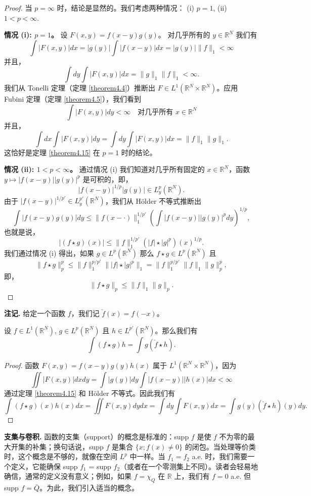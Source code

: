 \begin{proof}
当 $p=\infty$ 时，结论是显然的。我们考虑两种情况：
(i) $p=1$,
(ii) $1 < p < \infty$.

\textbf{情况 (i): $p=1$。} 设 $F(x, y) = f(x-y)g(y)$。
对几乎所有的 $y \in \mathbb{R}^N$ 我们有
\[ \int |F(x,y)|dx = |g(y)| \int |f(x-y)|dx = |g(y)| \|f\|_1 < \infty \]
并且，
\[ \int dy \int |F(x,y)|dx = \|g\|_1 \|f\|_1 < \infty. \]
我们从 Tonelli 定理（定理 \ref{theorem4.4}）推断出 $F \in L^1(\mathbb{R}^N \times \mathbb{R}^N)$。应用 Fubini 定理（定理 \ref{theorem4.5}），我们看到
\[ \int |F(x,y)|dy < \infty \quad \text{对几乎所有 } x \in \mathbb{R}^N \]
并且，
\[ \int dx \int |F(x,y)|dy = \int dy \int |F(x,y)|dx = \|f\|_1 \|g\|_1. \]
这恰好是定理 \ref{theorem4.15} 在 $p=1$ 时的结论。

\textbf{情况 (ii): $1 < p < \infty$。} 通过情况 (i) 我们知道对几乎所有固定的 $x \in \mathbb{R}^N$，函数 $y \mapsto |f(x-y)| |g(y)|^p$ 是可积的，即，
\[ |f(x-y)|^{1/p} |g(y)| \in L^p_y(\mathbb{R}^N). \]
由于 $|f(x-y)|^{1/p'} \in L^{p'}_y(\mathbb{R}^N)$，我们从 Hölder 不等式推断出
\[ \int |f(x-y)g(y)|dy \le \|f(x-\cdot)\|_1^{1/p'} \left( \int |f(x-y)||g(y)|^p dy \right)^{1/p}, \]
也就是说，
\[ |(f \star g)(x)| \le \|f\|_1^{1/p'} (|f| \star |g|^p)(x)^{1/p}. \]
我们通过情况 (i) 得出，如果 $g \in L^p(\mathbb{R}^N)$ 那么 $f \star g \in L^p(\mathbb{R}^N)$ 且
\[ \|f \star g\|_p^p \le \|f\|_1^{p/p'} \| |f| \star |g|^p \|_1 = \|f\|_1^{p/p'} \|f\|_1 \|g\|_p^p, \]
即，
\[ \|f \star g\|_p \le \|f\|_1 \|g\|_p. \]
\end{proof}
\textbf{注记.} 给定一个函数 $f$，我们记 $\check{f}(x) = f(-x)$。

\begin{proposition}\label{proposition4.16}
设 $f \in L^1(\mathbb{R}^N)$, $g \in L^p(\mathbb{R}^N)$ 且 $h \in L^{p'}(\mathbb{R}^N)$。那么我们有
\[ \int (f \star g)h = \int g(\check{f} \star h). \]
\end{proposition}

\begin{proof}
函数 $F(x,y) = f(x-y)g(y)h(x)$ 属于 $L^1(\mathbb{R}^N \times \mathbb{R}^N)$，因为
\[ \iint |F(x,y)|dx dy = \int |g(y)|dy \int |f(x-y)||h(x)|dx < \infty \]
通过定理 \ref{theorem4.15} 和 Hölder 不等式。因此我们有
\[ \int (f \star g)(x) h(x) dx = \iint F(x,y) dy dx = \int dy \int F(x,y) dx = \int g(y) (\check{f} \star h)(y) dy. \]
\end{proof}

\textbf{支集与卷积.} 函数的支集（support）的概念是标准的：supp $f$ 是使 $f$ 不为零的最大开集的补集；换句话说，supp $f$ 是集合 $\{x; f(x) \ne 0\}$ 的闭包。当处理等价类时，这个概念是不够的，就像在空间 $L^p$ 中一样。当 $f_1=f_2$ a.e. 时，我们需要一个定义，它能确保 supp $f_1$ = supp $f_2$（或者在一个零测集上不同）。读者会轻易地确信，通常的定义没有意义；例如，如果 $f = \chi_Q$ 在 $\mathbb{R}$ 上，我们有 $f=0$ a.e. 但 supp $f = \bar{Q}$。为此，我们引入适当的概念。

